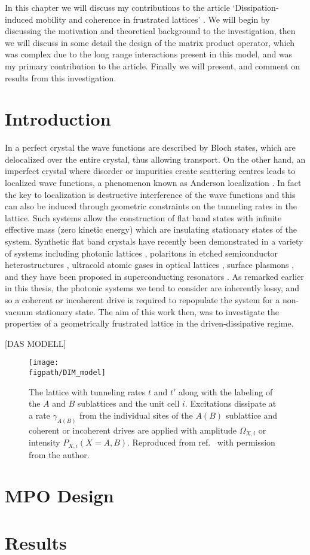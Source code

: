 In this chapter we will discuss my contributions to the article `Dissipation-induced mobility and coherence in frustrated lattices' \cite{OBH17}. We will begin by discussing the motivation and theoretical background to the investigation, then we will discuss in some detail the design of the matrix product operator, which was complex due to the long range interactions present in this model, and was my primary contribution to the article. Finally we will present, and comment on results from this investigation.

\section{Introduction}
In a perfect crystal the wave functions are described by Bloch states, which are delocalized over the entire crystal, thus allowing transport. On the other hand, an imperfect crystal where disorder or impurities create scattering centres leads to localized wave functions, a phenomenon known as Anderson localization \cite{Anderson58,LR85,SSC13}. In fact the key to localization is destructive interference of the wave functions and this can also be induced through geometric constraints on the tunneling rates in the lattice. Such systems allow the construction of flat band states with infinite effective mass (zero kinetic energy) which are insulating stationary states of the system. Synthetic flat band crystals have recently been demonstrated in a variety of systems including photonic lattices \cite{GuzmanSilvaEA14,VicencioEA15,MukherjeeEA15,MT15}, polaritons in etched semiconductor heterostructures \cite{JacqminEA14,BabouxEA16}, ultracold atomic gases in optical lattices \cite{TOINNT15}, surface plasmons \cite{NONK12,KUNNK16}, and they have been proposed in superconducting resonators \cite{YangEA16}. As remarked earlier in this thesis, the photonic systems we tend to consider are inherently lossy, and so a coherent or incoherent drive is required to repopulate the system for a non-vacuum stationary state. The aim of this work then, was to investigate the properties of a geometrically frustrated lattice in the driven-dissipative regime.  

[DAS MODELL]

\begin{figure}[ht!]
\centering
\texttt{[image: \\figpath/DIM\_model]}
\caption{The lattice with tunneling rates \(t\) and \(t'\) along with the labeling of the \(A\) and \(B\) sublattices and the unit cell \(i\). Excitations dissipate at a rate \(\gamma_{A(B)}\) from the individual sites of the \(A (B)\) sublattice and coherent or incoherent drives are applied with amplitude \(\Omega_{X, i}\) or intensity \(P_{X, i}(X = A,B)\). Reproduced from ref.~\cite{OBH17} with permission from the author.}
\label{fig:dim1-1}
\end{figure}

\section{MPO Design}

\section{Results} 